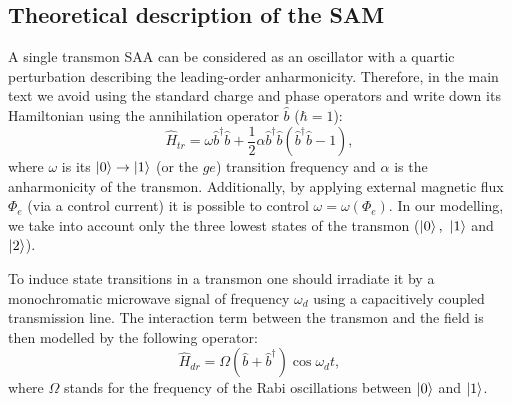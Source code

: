 \documentclass[%
 aip,
 amsmath,amssymb,
 reprint,%
]{revtex4-1}
\begin{document}
\subsection{Theoretical description of the SAM}

A single transmon SAA can be considered as an oscillator with a quartic perturbation describing the leading-order anharmonicity. Therefore, in the main text we avoid using the standard charge and phase operators and write down its Hamiltonian using the annihilation operator $\hat b$ ($\hbar = 1$):
\begin{equation}
\hat{{H}}_{tr} = \omega \hat b^{\dagger}\hat b +\frac{1}{2}\alpha \hat b^{\dagger}\hat b(\hat b^{\dagger}\hat b-1),
\end{equation}
where $\omega$ is its $\ket{0}\rightarrow\ket{1}$ (or the  $ge$) transition frequency and $\alpha$ is the anharmonicity of the transmon. Additionally, by applying external magnetic flux $\Phi_e$ (via a control current) it is possible to control $\omega = \omega(\Phi_e)$\cite{koch2007charge}. In our modelling, we take into account only the three lowest states of the transmon ($\ket{0},\ \ket{1}$ and $\ket{2}$).

To induce state transitions in a transmon one should irradiate it by a monochromatic microwave signal of frequency $\omega_d$ using a capacitively coupled transmission line. The interaction term between the transmon and the field is then modelled by the following operator: 
\begin{equation}
\hat H_{dr} = \Omega (\hat b+\hat b^{\dagger}) \cos\omega_d t,
\end{equation}
where $\Omega$ stands for the frequency of the Rabi oscillations between $\ket{0}$ and $\ket{1}$.
\end{document}

